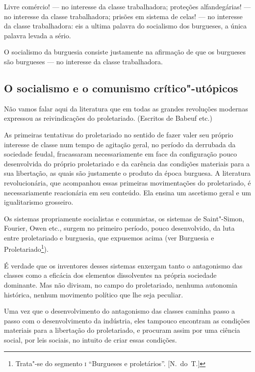 Livre comércio!  ---  no interesse da classe trabalhadora; proteções
alfandegárias!  ---  no interesse da classe trabalhadora; prisões em
sistema de celas!  ---  no interesse da classe trabalhadora: eis a ultima
palavra do socialismo dos burgueses, a única palavra levada a sério.

O socialismo da burguesia consiste justamente na afirmação de que os
burgueses são burgueses  ---  no interesse da classe trabalhadora.

\subsection[O socialismo e o comunismo crítico"-utópicos]{O socialismo e o comunismo crítico"-utópicos}

Não vamos falar aqui da literatura que em todas as grandes revoluções
modernas expressou as reivindicações do proletariado. (Escritos de
Babeuf etc.)

As primeiras tentativas do proletariado no sentido de fazer valer seu
próprio interesse de classe num tempo de agitação geral, no período da
derrubada da sociedade feudal, fracassaram necessariamente em face da
configuração pouco desenvolvida do próprio proletariado e da carência
das condições materiais para a sua libertação, as quais são justamente
o produto da época burguesa. A literatura revolucionária, que
acompanhou essas primeiras movimentações do proletariado, é
necessariamente reacionária em seu conteúdo. Ela ensina um ascetismo
geral e um igualitarismo grosseiro.

Os sistemas propriamente socialistas e comunistas, os sistemas
de Saint"-Simon, Fourier, Owen etc., surgem no primeiro período, pouco
desenvolvido, da luta entre proletariado e burguesia, que expusemos
acima (ver Burguesia e
Proletariado\footnote{ Trata"-se do segmento \textsc{i} “Burgueses e
proletários”. [N.~do~T.]}).

É verdade que os inventores desses sistemas enxergam tanto o antagonismo
das classes como a eficácia dos elementos dissolventes na própria
sociedade dominante. Mas não divisam, no campo do proletariado, nenhuma
autonomia histórica, nenhum movimento político que lhe seja peculiar.

Uma vez que o desenvolvimento do antagonismo das classes caminha passo a
passo com o desenvolvimento da indústria, eles tampouco encontram as
condições materiais para a libertação do proletariado, e procuram assim
por uma ciência social, por leis sociais, no intuito de criar essas
condições.

